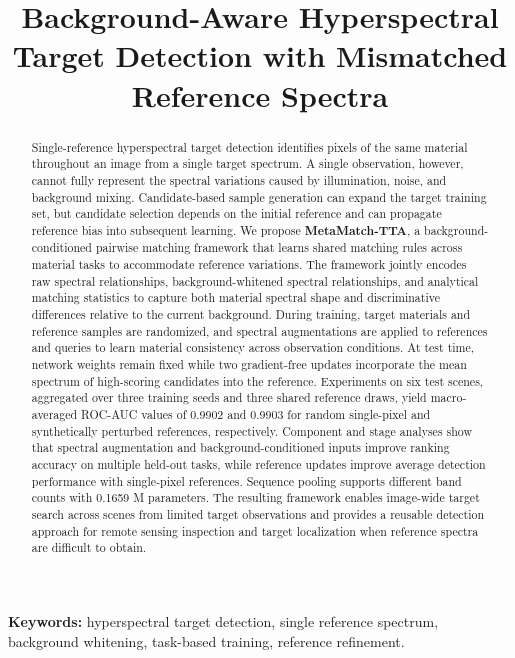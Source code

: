 \documentclass[a4paper,11pt]{article}
\title{\bfseries Background-Aware Hyperspectral Target Detection with Mismatched Reference Spectra}
\author{}
\date{}
\newcommand{\method}{\textbf{MetaMatch-TTA}}
\begin{document}
\maketitle
\vspace{-2.5em}
\begin{abstract}
Single-reference hyperspectral target detection identifies pixels of the same material throughout an image from a single target spectrum. A single observation, however, cannot fully represent the spectral variations caused by illumination, noise, and background mixing. Candidate-based sample generation can expand the target training set, but candidate selection depends on the initial reference and can propagate reference bias into subsequent learning. We propose \method{}, a background-conditioned pairwise matching framework that learns shared matching rules across material tasks to accommodate reference variations. The framework jointly encodes raw spectral relationships, background-whitened spectral relationships, and analytical matching statistics to capture both material spectral shape and discriminative differences relative to the current background. During training, target materials and reference samples are randomized, and spectral augmentations are applied to references and queries to learn material consistency across observation conditions. At test time, network weights remain fixed while two gradient-free updates incorporate the mean spectrum of high-scoring candidates into the reference. Experiments on six test scenes, aggregated over three training seeds and three shared reference draws, yield macro-averaged ROC-AUC values of 0.9902 and 0.9903 for random single-pixel and synthetically perturbed references, respectively. Component and stage analyses show that spectral augmentation and background-conditioned inputs improve ranking accuracy on multiple held-out tasks, while reference updates improve average detection performance with single-pixel references. Sequence pooling supports different band counts with 0.1659 M parameters. The resulting framework enables image-wide target search across scenes from limited target observations and provides a reusable detection approach for remote sensing inspection and target localization when reference spectra are difficult to obtain.
\end{abstract}
\noindent\textbf{Keywords:} hyperspectral target detection, single reference spectrum, background whitening, task-based training, reference refinement.
\end{document}
